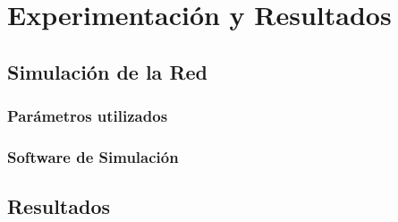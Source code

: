 \chapter{Experimentación y Resultados}
\section{Simulación de la Red}
\subsection{Parámetros utilizados}
\subsection{Software de Simulación}
\section{Resultados}